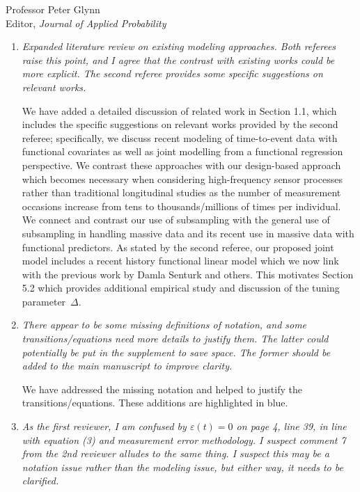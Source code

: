 \documentclass[11pt]{letter} %
\begin{document}
\begin{letter}{Professor
	Peter Glynn\\
	Editor, {\em Journal of Applied Probability}}
\begin{enumerate}
\item {\it Expanded literature review on existing modeling approaches. Both referees raise this point, and I agree that the contrast with existing works could be more explicit. The second referee provides some specific suggestions on relevant works.}

\vspace{5mm}
We have added a detailed discussion of related work in Section 1.1, which includes the specific suggestions on relevant works provided by the second referee; specifically, we discuss recent modeling of time-to-event data with functional covariates as well as joint modelling from a functional regression perspective.  We contrast these approaches with our design-based approach which becomes necessary when considering high-frequency sensor processes rather than traditional longitudinal studies as the number of measurement occasions increase from tens to thousands/millions of times per individual.  We connect and contrast our use of subsampling with the general use of subsampling in handling massive data and its recent use in massive data with functional predictors.  As stated by the second referee, our proposed joint model includes a recent history functional linear model which we now link with the previous work by Damla Senturk and others.  This motivates Section 5.2 which provides additional empirical study and discussion of the tuning parameter~$\Delta$.
\vspace{5mm}

\item {\it There appear to be some missing definitions of notation, and some transitions/equations need more details to justify them. The latter could potentially be put in the supplement to save space. The former should be added to the main manuscript to improve clarity.}

\vspace{5mm}
We have addressed the missing notation and helped to justify the transitions/equations.  These additions are highlighted in blue.
\vspace{5mm}

\item {\it As the first reviewer, I am confused by $\varepsilon(t) = 0$ on page 4, line 39, in line with equation (3) and measurement error methodology. I suspect comment 7 from the 2nd reviewer alludes to the same thing. I suspect this may be a notation issue rather than the modeling issue, but either way, it needs to be clarified.}


\end{enumerate}
\end{letter}
\end{document}
